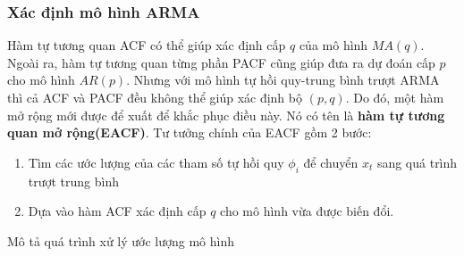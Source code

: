 \subsubsection{Xác định mô hình ARMA}
Hàm tự tương quan ACF có thể giúp xác định cấp $q$ của mô hình $MA(q)$. Ngoài ra, hàm tự tương quan từng phần PACF cũng giúp đưa ra dự đoán cấp $p$ cho mô hình $AR(p)$. Nhưng với mô hình tự hồi quy-trung bình trượt ARMA thì cả ACF và PACF đều không thể giúp xác định bộ $(p,q)$. Do đó, một hàm mở rộng mới được để xuất để khắc phục điều này. Nó có tên là \textbf{hàm tự tương quan mở rộng(EACF)}.
Tư tưởng chính của EACF gồm 2 bước:
\begin{enumerate}
\item Tìm các ước lượng của các tham số tự hồi quy $\phi_i$ để chuyển $x_t$ sang quá trình trượt trung bình
\item Dựa vào hàm ACF xác định cấp $q$ cho mô hình vừa được biến đổi.
\end{enumerate}
Mô tả quá trình xử lý ước lượng mô hình \label{EACFlabel}
